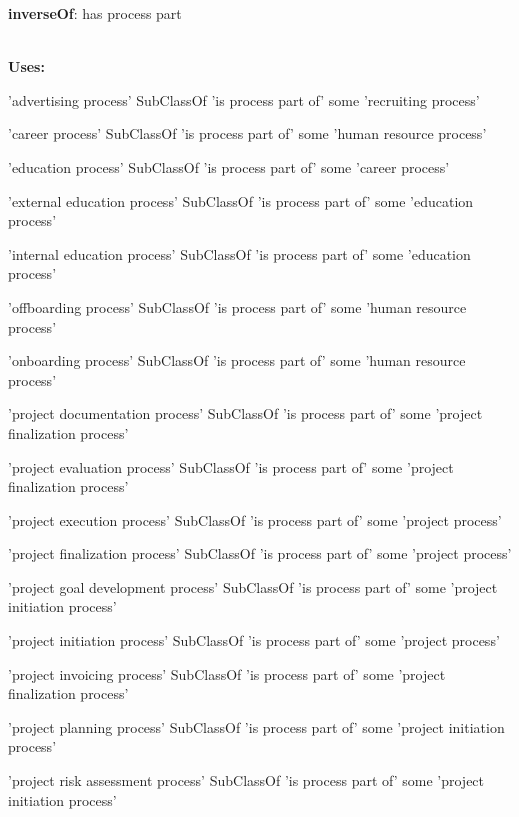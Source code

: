 \documentclass[a4paper, DIV=13, BCOR=0cm]{scrbook}
\begin{document}
\begin{mdframed}[style=onto, frametitle={is process part of}]
	{%
		\begin{compactitem}
			\item \textbf{inverseOf}: has process part
		\end{compactitem}
		\hrulefill\\
		\textbf{Uses:}
		\begin{compactitem}
			\item 'advertising process' SubClassOf 'is process part of' some 'recruiting process'
			\item 'career process' SubClassOf 'is process part of' some 'human resource process'
			\item 'education process' SubClassOf 'is process part of' some 'career process'
			\item 'external education process' SubClassOf 'is process part of' some 'education process'
			\item 'internal education process' SubClassOf 'is process part of' some 'education process'
			\item 'offboarding process' SubClassOf 'is process part of' some 'human resource process'
			\item 'onboarding process' SubClassOf 'is process part of' some 'human resource process'
			\item 'project documentation process' SubClassOf 'is process part of' some 'project finalization process'
			\item 'project evaluation process' SubClassOf 'is process part of' some 'project finalization process'
			\item 'project execution process' SubClassOf 'is process part of' some 'project process'
			\item 'project finalization process' SubClassOf 'is process part of' some 'project process'
			\item 'project goal development process' SubClassOf 'is process part of' some 'project initiation process'
			\item 'project initiation process' SubClassOf 'is process part of' some 'project process'
			\item 'project invoicing process' SubClassOf 'is process part of' some 'project finalization process'
			\item 'project planning process' SubClassOf 'is process part of' some 'project initiation process'
			\item 'project risk assessment process' SubClassOf 'is process part of' some 'project initiation process'

\end{compactitem}}
\end{mdframed}
\end{document}
